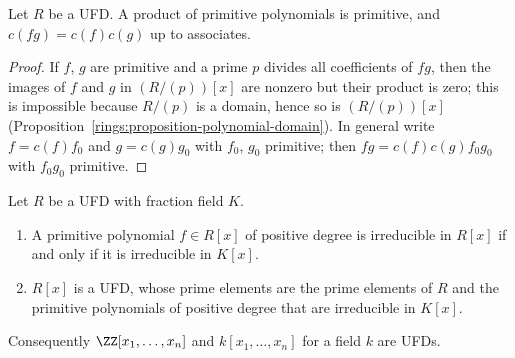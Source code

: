 \begin{lemma}[Gauss]\label{rings:lemma-gauss}
Let $R$ be a UFD. A product of primitive polynomials is primitive, and
$c(fg) = c(f)c(g)$ up to associates.
\end{lemma}

\begin{proof}
If $f$, $g$ are primitive and a prime $p$ divides all coefficients of $fg$, then the images
of $f$ and $g$ in $(R/(p))[x]$ are nonzero but their product is zero; this is impossible
because $R/(p)$ is a domain, hence so is $(R/(p))[x]$
(Proposition~\ref{rings:proposition-polynomial-domain}). In general write $f = c(f)f_0$ and
$g = c(g)g_0$ with $f_0$, $g_0$ primitive; then $fg = c(f)c(g) f_0 g_0$ with $f_0g_0$
primitive.
\end{proof}

\begin{theorem}\label{rings:theorem-polynomial-ufd}
Let $R$ be a UFD with fraction field $K$.
\begin{enumerate}
\item A primitive polynomial $f \in R[x]$ of positive degree is irreducible in $R[x]$ if
and only if it is irreducible in $K[x]$.
\item $R[x]$ is a UFD, whose prime elements are the prime elements of $R$ and the
primitive polynomials of positive degree that are irreducible in $K[x]$.
\end{enumerate}
Consequently $\ZZ[x_1, \ldots, x_n]$ and $k[x_1, \ldots, x_n]$ for a field $k$ are UFDs.
\end{theorem}

